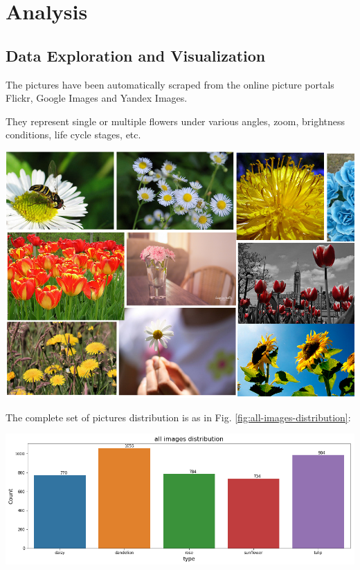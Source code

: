 \section{Analysis}

\subsection{Data Exploration and Visualization}
\label{subsec:Data_exploration_and_visualization}

The pictures have been automatically scraped from the online picture portals Flickr, Google Images and Yandex Images.

They represent single or multiple flowers under various angles, zoom, brightness conditions, life cycle stages, etc. 
\begin{center}
	\includegraphics[scale=.25]{./sections/02_analysis/flowers_patchwork.png}
\end{center}

The complete set of pictures distribution is as in Fig. \ref{fig:all-images-distribution}:

\begin{flushleft}
	\includegraphics[scale=.5]{./sections/02_analysis/all_images_distribution}
	\label{fig:all-images-distribution}
\end{flushleft}

